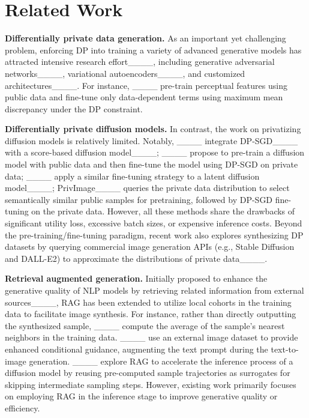 \section{Related Work}
{\bf Differentially private data generation.} As an important yet challenging problem, enforcing DP into training a variety of advanced generative models has attracted intensive research effort____, including generative adversarial networks____, variational autoencoders____, and customized architectures____. For instance, ____ pre-train perceptual features using public data and fine-tune only data-dependent terms using maximum mean discrepancy under the DP constraint. 

{\bf Differentially private diffusion models.} In contrast, the work on privatizing diffusion models is relatively limited. Notably, \dpdm____ integrate DP-SGD____ with a score-based diffusion model____; ____ propose to pre-train a diffusion model with public data and then fine-tune the model using DP-SGD on private data; \dpldm____ apply a similar fine-tuning strategy to a latent diffusion model____; PrivImage____ queries the private data distribution to select semantically similar public samples for pretraining, followed by DP-SGD fine-tuning on the private data. However, all these methods share the drawbacks of significant utility loss, excessive batch sizes, or expensive inference costs. Beyond the pre-training/fine-tuning paradigm, recent work also explores synthesizing DP datasets by querying commercial image generation APIs (e.g., Stable Diffusion and DALL-E2) to approximate the distributions of private data____. 


{\bf Retrieval augmented generation.} Initially proposed to enhance the generative quality of NLP models by retrieving related information from external sources____, RAG has been extended to utilize local cohorts in the training data to facilitate image synthesis. For instance, rather than directly outputting the synthesized sample, ____ compute the average of the sample's nearest neighbors in the training data. ____ use an external image dataset to provide enhanced conditional guidance, augmenting the text prompt during the text-to-image generation. ____ explore RAG to accelerate the inference process of a diffusion model by reusing pre-computed sample trajectories as surrogates for skipping intermediate sampling steps. However, existing work primarily focuses on employing RAG in the inference stage to improve generative quality or efficiency.


